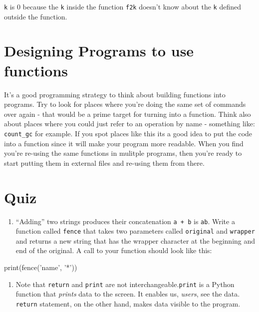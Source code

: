 \documentclass[]{book}
\newenvironment{Shaded}{\begin{snugshade}}{\end{snugshade}}
\newcommand{\BuiltInTok}[1]{#1}
\newcommand{\NormalTok}[1]{#1}
\newcommand{\StringTok}[1]{\textcolor[rgb]{0.31,0.60,0.02}{#1}}
\providecommand{\tightlist}{%
  \setlength{\itemsep}{0pt}\setlength{\parskip}{0pt}}
\theoremstyle{definition}
\theoremstyle{definition}
\theoremstyle{definition}
\theoremstyle{remark}
\begin{document}
\texttt{k} is 0 because the \texttt{k} inside the function \texttt{f2k}
doesn't know about the \texttt{k} defined outside the function.

\hypertarget{designing-programs-to-use-functions}{%
\section{Designing Programs to use
functions}\label{designing-programs-to-use-functions}}

It's a good programming strategy to think about building functions into
programs. Try to look for places where you're doing the same set of
commands over again - that would be a prime target for turning into a
function. Think also about places where you could just refer to an
operation by name - something like: \texttt{count\_gc} for example. If
you spot places like this its a good idea to put the code into a
function since it will make your program more readable. When you find
you're re-using the same functions in mulitple programs, then you're
ready to start putting them in external files and re-using them from
there.

\hypertarget{quiz-4}{%
\section{Quiz}\label{quiz-4}}

\begin{enumerate}
\def\labelenumi{\arabic{enumi}.}
\tightlist
\item
  ``Adding'' two strings produces their concatenation
  \texttt{\textquotesingle{}a\textquotesingle{}\ +\ \textquotesingle{}b\textquotesingle{}}
  is \texttt{\textquotesingle{}ab\textquotesingle{}}. Write a function
  called \texttt{fence} that takes two parameters called
  \texttt{original} and \texttt{wrapper} and returns a new string that
  has the wrapper character at the beginning and end of the original. A
  call to your function should look like this:
\end{enumerate}

\begin{Shaded}
\begin{Highlighting}[]
\BuiltInTok{print}\NormalTok{(fence(}\StringTok{'name'}\NormalTok{, }\StringTok{'*'}\NormalTok{))}
\end{Highlighting}
\end{Shaded}

\begin{enumerate}
\def\labelenumi{\arabic{enumi}.}
\setcounter{enumi}{1}
\tightlist
\item
  Note that \texttt{return} and \texttt{print} are not
  interchangeable.\texttt{print} is a Python function that \emph{prints}
  data to the screen. It enables us, \emph{users}, see the data.
  \texttt{return} statement, on the other hand, makes data visible to
  the program.
\end{enumerate}
\end{document}
